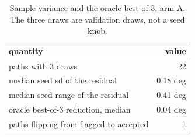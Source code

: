 \begin{table}[t]
\footnotesize
\begin{tabular}{lr}
\toprule
quantity & value \\
\midrule
paths with 3 draws & 22 \\
median seed sd of the residual & 0.18 deg \\
median seed range of the residual & 0.41 deg \\
oracle best-of-3 reduction, median & 0.04 deg \\
paths flipping from flagged to accepted & 1 \\
\bottomrule
\end{tabular}
\caption{Sample variance and the oracle best-of-3, arm A.  The three draws are validation draws, not a seed knob.}
\label{tab:h04-sampling}
\end{table}

